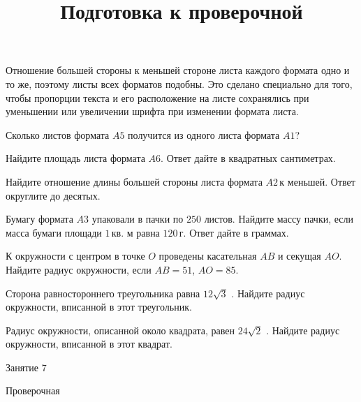 \begin{homework}[number=3]
\begin{listofex}
\begin{center}
		\end{center}
		Отношение большей стороны к меньшей стороне листа каждого формата одно и то же, поэтому листы всех форматов подобны. Это сделано специально для того, чтобы пропорции текста и его расположение на листе сохранялись при уменьшении или увеличении шрифта при изменении формата листа.
		\item Сколько листов формата \( A5 \) получится из одного листа формата \( A1 \)?
		\item Найдите площадь листа формата \( A6 \). Ответ дайте в квадратных сантиметрах.
		\item Найдите отношение длины большей стороны листа формата \( A2 \) к меньшей. Ответ округлите до десятых.
		\item Бумагу формата \( A3 \) упаковали в пачки по \( 250 \) листов. Найдите массу пачки, если масса бумаги площади \( 1 \) кв. м равна \( 120 \) г. Ответ дайте в граммах.
		\item К окружности с центром в точке \( O \) проведены касательная \( AB \) и секущая \( AO \). Найдите радиус окружности, если \( AB=51 \), \( AO=85 \).
		\item Сторона равностороннего треугольника равна \( 12\sqrt{3} \) . Найдите радиус окружности, вписанной в этот треугольник.
		\item Радиус окружности, описанной около квадрата, равен \( 24\sqrt{2} \) . Найдите радиус окружности, вписанной в этот квадрат.
	\end{listofex}
\end{homework}

\begin{class}[number=7]
	\title{Подготовка к проверочной}
	\begin{listofex}
		\item Занятие 7
	\end{listofex}
\end{class}

\begin{exam}
	\begin{listofex}
		\item Проверочная
	\end{listofex}
\end{exam}

